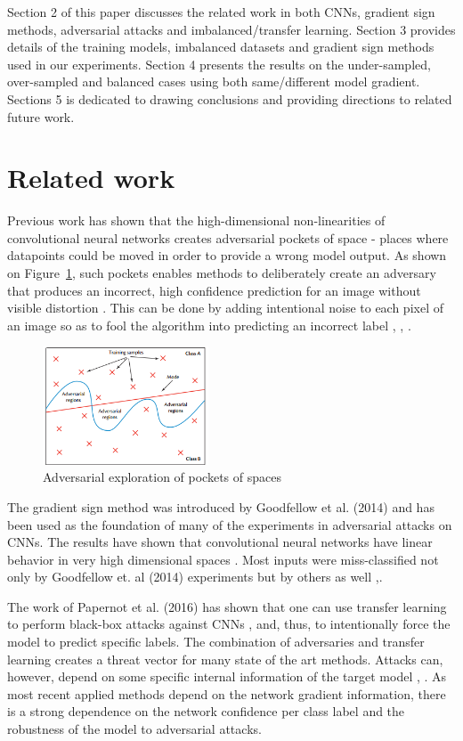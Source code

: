 \documentclass[runningheads,a4paper]{llncs}
\begin{document}
Section 2 of this paper discusses the related work in both CNNs, gradient sign methods, adversarial attacks and imbalanced/transfer learning. Section 3 provides details of the training models, imbalanced datasets and gradient sign methods used in our experiments. Section 4 presents the results on the under-sampled, over-sampled and balanced cases using both same/different model gradient. Sections 5 is dedicated to drawing conclusions and providing directions to related future work.
\section{Related work}


Previous work has shown that the high-dimensional non-linearities of convolutional neural networks \cite{lawrence1997face} creates adversarial pockets of space - places where datapoints could be moved in order to provide a wrong model output. As shown on Figure~\ref{fig:adv_space}, such pockets enables methods to deliberately create an adversary that produces an incorrect, high confidence prediction for an image without visible distortion \cite{papernot_thesis_2016}. This can be done by adding intentional noise to each pixel of an image so as to fool the algorithm into predicting an incorrect label \cite{goodfellow2014}, \cite{papernot2016transf}, \cite{szegedy2013}.

\begin{figure}
	\centering
	\includegraphics[height=3.5cm]{adv_space.png}
	\caption{Adversarial exploration of pockets of spaces \cite{papernot_2017}}
	\label{fig:adv_space}
\end{figure}

The gradient sign method was introduced by Goodfellow et al. (2014) and has been used as the foundation of many of the experiments in adversarial attacks on CNNs. The results have shown that convolutional neural networks have linear behavior in very high dimensional spaces \cite{goodfellow2014}.  Most inputs were miss-classified not only by Goodfellow et. al (2014) experiments but by others as well \cite{billovits},\cite{papernot2016}.

The work of Papernot et al. (2016) has shown that one can use transfer learning to perform black-box attacks against CNNs \cite{papernot2016transf}, \cite{yosinski2014transferable} and, thus, to intentionally force the model to predict specific labels. The combination of adversaries and transfer learning creates a threat vector for many state of the art methods. Attacks can, however, depend on some specific internal information of the target model \cite{lowd2005}, \cite{papernot2016transf}. As most recent applied methods depend on the network gradient information, there is a strong dependence on the network confidence per class label and the robustness of the model to adversarial attacks.
\end{document}
